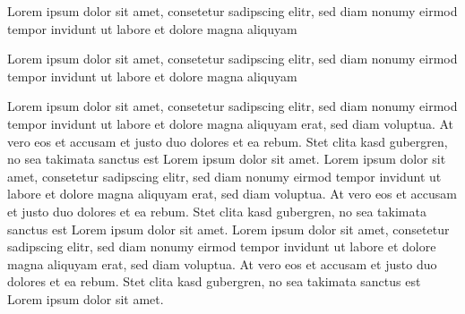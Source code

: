 \documentclass[landscape]{article}
\newenvironment{results}[1]{%
    \tcolorbox[noparskip,frame hidden,boxrule=0.5mm,colframe=MPIIlightgray,
    colbacktitle=MPIIlightgray,coltitle=MPIIblue,
    colback=MPIIwhite,
    titlerule=0mm,sharpish corners,no shadow,
    left=1.5mm,top=1.5mm,right=1.5mm,bottom=1mm,
    lefttitle=1.5mm,toptitle=2mm,righttitle=1.5mm,bottomtitle=2mm,
    title=#1]}%
{\endtcolorbox}
\begin{document}
    
    \begin{minipage}[t]{0.32\textwidth}
        \strut\vspace*{-\baselineskip} %
        
        \begin{results}{\Large\bf \fcolorbox{MPIIblue}{MPIIblue}{\hskip 0.05cm\color{MPIIwhite}1\hskip 0.05cm} Part 1}
            
            \vspace*{-1mm}
            \centering
            \begin{minipage}[t]{0.45\textwidth}
                Lorem ipsum dolor sit amet, consetetur sadipscing elitr, sed diam nonumy eirmod tempor invidunt ut labore et dolore magna aliquyam 
            \end{minipage}
            \begin{minipage}[t]{0.49\textwidth}
                Lorem ipsum dolor sit amet, consetetur sadipscing elitr, sed diam nonumy eirmod tempor invidunt ut labore et dolore magna aliquyam
            \end{minipage}
            \vspace*{-1mm}
        \end{results}
        
        \vspace*{-1mm}
        \begin{results}{\Large\bf \fcolorbox{MPIIblue}{MPIIblue}{\hskip 0.05cm\color{MPIIwhite}4\hskip 0.05cm} Part 4}
            
            Lorem ipsum dolor sit amet, consetetur sadipscing elitr, sed diam nonumy eirmod tempor invidunt ut labore et dolore magna aliquyam erat, sed diam voluptua. At vero eos et accusam et justo duo dolores et ea rebum. Stet clita kasd gubergren, no sea takimata sanctus est Lorem ipsum dolor sit amet. Lorem ipsum dolor sit amet, consetetur sadipscing elitr, sed diam nonumy eirmod tempor invidunt ut labore et dolore magna aliquyam erat, sed diam voluptua. At vero eos et accusam et justo duo dolores et ea rebum. Stet clita kasd gubergren, no sea takimata sanctus est Lorem ipsum dolor sit amet. Lorem ipsum dolor sit amet, consetetur sadipscing elitr, sed diam nonumy eirmod tempor invidunt ut labore et dolore magna aliquyam erat, sed diam voluptua. At vero eos et accusam et justo duo dolores et ea rebum. Stet clita kasd gubergren, no sea takimata sanctus est Lorem ipsum dolor sit amet. 
        \end{results}
    \end{minipage}
\end{document}

